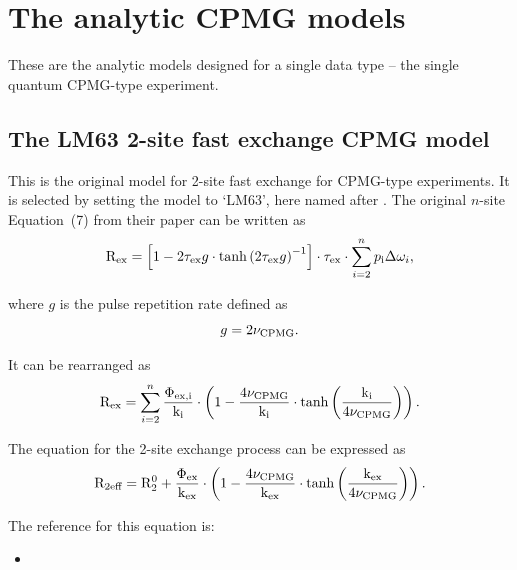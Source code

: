 
\section{The analytic CPMG models}
\label{sect: dispersion: analytic CPMG models}

These are the analytic models designed for a single data type -- the single quantum CPMG-type experiment.



\subsection{The LM63 2-site fast exchange CPMG model}
\label{sect: dispersion: LM63 model}

This is the original model for 2-site fast exchange for CPMG-type experiments.
It is selected by setting the model to `LM63', here named after \citet{LuzMeiboom63}.
The original $n$-site Equation~(7) from their paper can be written as
\begin{equation}
    \mathrm{R}_\textrm{ex} = \left[ 1 - 2\tau_\textrm{ex} g \cdot \tanh \left( 2\tau_\textrm{ex} g \right)^{-1} \right] \cdot \tau_\textrm{ex} \cdot \sum_{i=2}^n p_\textrm{i}\Delta\omega_{i},
\end{equation}

where $g$ is the pulse repetition rate defined as
\begin{equation}
    g = 2\nu_\textrm{CPMG}.
\end{equation}

It can be rearranged as
\begin{equation} \label{eq: Luz-Meiboom}
    \mathrm{R}_\textrm{ex} = \sum_{i=2}^n \frac{\Phi_\textrm{ex,i}}{\textrm{k}_\textrm{i}} \cdot \left( 1 - \frac{4\nu_\textrm{CPMG}}{\textrm{k}_\textrm{i}} \cdot \tanh \left( \frac{\textrm{k}_\textrm{i}}{4\nu_\textrm{CPMG}} \right) \right).
\end{equation}


The equation for the 2-site exchange process can be expressed as
\begin{equation}
    \mathrm{R}_\textrm{2eff} = \mathrm{R}_2^0 + \frac{\Phi_\textrm{ex}}{\textrm{k}_\textrm{ex}} \cdot \left( 1 - \frac{4\nu_\textrm{CPMG}}{\textrm{k}_\textrm{ex}} \cdot \tanh \left( \frac{\textrm{k}_\textrm{ex}}{4\nu_\textrm{CPMG}} \right) \right).
\end{equation}

The reference for this equation is:
\begin{itemize}
  \item {}
\end{itemize}

